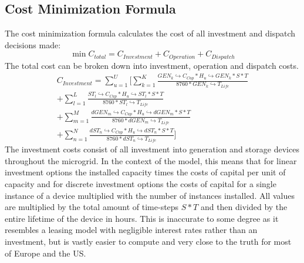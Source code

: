 \documentclass[
	11pt,								%
	DIV10,								%
	a4paper,         					%
	oneside,							%
	headheight=20pt,					%
	footheight=20pt,					%
    parskip=full,						%
    listof=totoc,						%
	bibliography=totoc,					%
	index=totoc,						%
]{scrartcl}
\begin{document}
\subsection{Cost Minimization Formula}
The cost minimization formula calculates the cost of all investment and dispatch decisions made:
\begin{equation}
	\min C_{total} = C_{Investment} + C_{Operation} + C_{Dispatch}
\end{equation}
The total cost can be broken down into investment, operation and dispatch costs. 
\begin{equation}
	\begin{split}
		C_{Investment} = \sum_{u=1}^{U}[\sum_{k=1}^K{\frac{GEN_k\hookrightarrow  C_{Cap} * H_u\hookrightarrow  GEN_k * S * T}
		{8760*GEN_k\hookrightarrow T_{Life}}}\\
		+ \sum_{l=1}^L{\frac{ST_l\hookrightarrow  C_{Cap} * H_u\hookrightarrow  ST_l * S * T}
		{8760*ST_l\hookrightarrow T_{Life}}}\\
		+ \sum_{m=1}^M{\frac{dGEN_m\hookrightarrow  C_{Cap} * H_u\hookrightarrow  dGEN_m * S * T}
		{8760*dGEN_m\hookrightarrow T_{Life}}}\\
		+ \sum_{n=1}^N{\frac{dST_n\hookrightarrow  C_{Cap} * H_u\hookrightarrow  dST_n * S * T}
		{8760*dST_n\hookrightarrow T_{Life}}}]
	\end{split}
\end{equation}
The investment costs consist of all investment into generation and storage devices throughout the microgrid. In the context of the model, this means that for linear investment options the installed capacity times the costs of capital per unit of capacity and for discrete investment options the costs of capital for a single instance of a device multiplied with the number of instances installed. All values are multiplied by the total amount of time-steps $S*T$ and then divided by the entire lifetime of the device in hours. This is inaccurate to some degree as it resembles a leasing model with negligible interest rates rather than an investment, but is vastly easier to compute and very close to the truth for most of Europe and the US.
\end{document}
